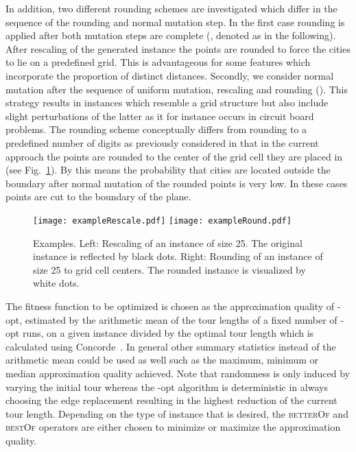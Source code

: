 \documentclass{article}
\begin{document}
In addition, two different rounding schemes are investigated which
differ in the sequence of the rounding and normal mutation step. In
the first case rounding is applied after both mutation steps are
complete (, denoted as  in the following). After rescaling
of the generated instance the points are rounded to force the cities
to lie on a predefined grid. This is advantageous for some features
which incorporate the proportion of distinct distances. Secondly, we
consider normal mutation after the sequence of uniform mutation,
rescaling and rounding (). This strategy results in instances
which resemble a grid structure but also include slight perturbations
of the latter as it for instance occurs in circuit board problems. The
rounding scheme conceptually differs from rounding to a predefined
number of digits as previously considered in that in the current
approach the points are rounded to the center of the grid cell they
are placed in (see Fig.~\ref{fig:exRescRound}). By this means the
probability that cities are located outside the boundary after normal
mutation of the rounded points is very low. In these cases points are cut to the boundary of the plane.

\begin{figure}
  \centering
  \texttt{[image: exampleRescale.pdf]}
  \texttt{[image: exampleRound.pdf]}
  \caption{Examples. Left: Rescaling of an instance of size 25. The
    original instance is reflected by black dots. Right: Rounding of
    an instance of size 25 to grid cell centers. The rounded instance
    is visualized by white dots.}
  \label{fig:exRescRound}
\end{figure}

The fitness function to be optimized is chosen as the approximation
quality of -opt, estimated by the arithmetic mean of the tour
lengths of a fixed number of -opt runs, on a given instance divided
by the optimal tour length which is calculated using
Concorde~\cite{journals/informs/ApplegateCDR02}. In general other
summary statistics instead of the arithmetic mean could be used as
well such as the maximum, minimum or median approximation quality
achieved. Note that randomness is only induced by varying the initial
tour whereas the -opt algorithm is deterministic in always choosing
the edge replacement resulting in the highest reduction of the current
tour length.  Depending on the type of instance that is desired, the
\textsc{betterOf} and \textsc{bestOf} operators are either chosen to
minimize or maximize the approximation quality.
\end{document}
